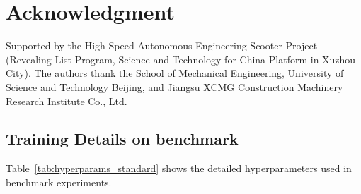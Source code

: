 \documentclass[journal]{IEEEtran}
\begin{document}
	\section{Acknowledgment}
	
	Supported by the High-Speed Autonomous Engineering Scooter Project (Revealing List Program, Science and Technology for China Platform in Xuzhou City).
	The authors thank the School of Mechanical Engineering, University of Science and Technology Beijing, and Jiangsu XCMG Construction Machinery Research Institute Co., Ltd.
	
	\appendix
	
	\subsection{Training Details on benchmark}
	\label{benchmark_training_details}
	
	Table~\ref{tab:hyperparams_standard} shows the detailed hyperparameters used in benchmark experiments.
	
\end{document}
